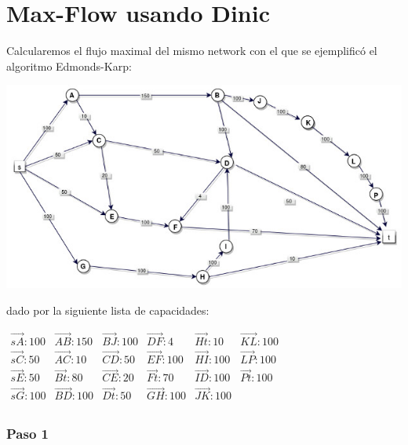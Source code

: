 \documentclass[10pt,a4paper]{article}
\begin{document}
\section*{Max-Flow usando Dinic}

Calcularemos el flujo maximal del mismo network con el que se ejemplificó el algoritmo Edmonds-Karp:

\begin{center}

    \begin{adjustbox}{max size={\textwidth}{\textheight}}
        \includegraphics{definitions/EK1.jpg}
        \end{adjustbox}
    
\end{center}

dado por la siguiente lista de capacidades:

$\begin{array}{llllll} \overrightarrow{sA}: 100& \overrightarrow{AB}: 150&\overrightarrow{BJ}: 100&\overrightarrow{DF}: 4&\overrightarrow{Ht}:10&\overrightarrow{KL}: 100\\ \overrightarrow{sC}: 50& \overrightarrow{AC}: 10&\overrightarrow{CD}: 50&\overrightarrow{EF}: 100&\overrightarrow{HI}: 100&\overrightarrow{LP}: 100\\ \overrightarrow{sE}: 50& \overrightarrow{Bt}: 80&\overrightarrow{CE}: 20&\overrightarrow{Ft}: 70&\overrightarrow{ID}: 100&\overrightarrow{Pt}: 100\\ \overrightarrow{sG}:100& \overrightarrow{BD}: 100&\overrightarrow{Dt}:50&\overrightarrow{GH}: 100&\overrightarrow{JK}: 100&\\ \end{array}$

\subsubsection*{Paso 1}
\end{document}
